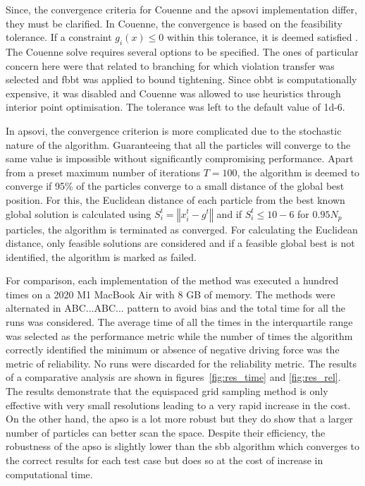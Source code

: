 	Since, the convergence criteria for Couenne and the \gls{apsovi} implementation differ, they must be clarified. In Couenne, the convergence is based on the feasibility tolerance. If a constraint $g_i(x) \leq 0$ within this tolerance, it is deemed satisfied \cite{Belotti:2022aa}. The Couenne solve requires several options to be specified. The ones of particular concern here were that related to branching for which violation transfer was selected and \gls{fbbt} was applied to bound tightening. Since \gls{obbt} is computationally expensive, it was disabled and Couenne was allowed to use heuristics through interior point optimisation. The tolerance was left to the default value of \num{1d-6}.
	
	In \gls{apsovi}, the convergence criterion is more complicated due to the stochastic nature of the algorithm. Guaranteeing that all the particles will converge to the same value is impossible without significantly compromising performance. Apart from a preset maximum number of iterations $T = 100$, the algorithm is deemed to converge if 95\% of the particles converge to a small distance of the global best position. For this, the Euclidean distance of each particle from the best known global solution is calculated using $S_i^t = \left \Vert x_i^t - g^t\right \Vert$ and if $S_i^t \leq 10-6$ for $0.95 N_p$ particles, the algorithm is terminated as converged. For calculating the Euclidean distance, only feasible solutions are considered and if a feasible global best is not identified, the algorithm is marked as failed.
	
	For comparison, each implementation of the method was executed a hundred times on a 2020 M1 MacBook Air with 8 GB of memory. The methods were alternated in ABC...ABC... pattern to avoid bias and the total time for all the runs was considered. The average time of all the times in the interquartile range was selected as the performance metric while the number of times the algorithm correctly identified the minimum or absence of negative driving force was the metric of reliability. No runs were discarded for the reliability metric. The results of a comparative analysis are shown in figures~\ref{fig:res_time} and \ref{fig:res_rel}. The results demonstrate that the equispaced grid sampling method is only effective with very small resolutions leading to a very rapid increase in the cost. On the other hand, the \gls{apso} is a lot more robust but they do show that a larger number of particles can better scan the space. Despite their efficiency, the robustness of the \gls{apso} is slightly lower than the \gls{sbb} algorithm which converges to the correct results for each test case but does so at the cost of increase in computational time. 

